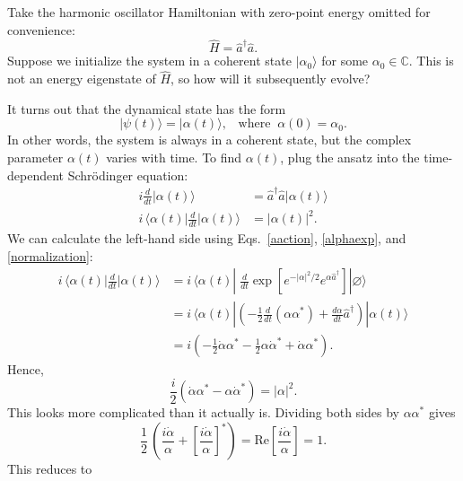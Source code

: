 \documentclass[pra,12pt]{revtex4}
\begin{document}
Take the harmonic oscillator Hamiltonian with zero-point energy
omitted for convenience:
\begin{equation}
  \hat{H} = \hat{a}^\dagger \hat{a}.
\end{equation}
Suppose we initialize the system in a coherent state
$|\alpha_0\rangle$ for some $\alpha_0 \in \mathbb{C}$.  This is not an
energy eigenstate of $\hat{H}$, so how will it subsequently evolve?

It turns out that the dynamical state has the form
\begin{equation}
  |\psi(t)\rangle = |\alpha(t)\rangle, \;\;\;\mathrm{where}\;\;\alpha(0) = \alpha_0.
\end{equation}
In other words, the system is always in a coherent state, but the
complex parameter $\alpha(t)$ varies with time.  To find $\alpha(t)$,
plug the ansatz into the time-dependent Schr\"odinger equation:
\begin{align}
  i \frac{d}{dt} |\alpha(t)\rangle &= \hat{a}^\dagger \hat{a} |\alpha(t)\rangle\\
  i \,\Big\langle\alpha(t)\Big| \frac{d}{dt} \Big|\alpha(t)\Big\rangle &=
  |\alpha(t)|^2.
\end{align}
We can calculate the left-hand side using Eqs.~\eqref{aaction},
\eqref{alphaexp}, and \eqref{normalization}:
\begin{align}
  i \, \Big\langle\alpha(t)\Big| \frac{d}{dt} \Big|\alpha(t)\Big\rangle
  &= i\, \langle \alpha(t) | \; \frac{d}{dt}
  \exp\left[ e^{-|\alpha|^2/2} e^{\alpha\hat{a}^\dagger} \right]
  |\varnothing\rangle \\
  &= i\, \langle \alpha(t) | \left(-\frac{1}{2} \frac{d}{dt}(\alpha\alpha^*)
  + \frac{d\alpha}{dt} \hat{a}^\dagger \right) |\alpha(t)\rangle \\
  &= i \left(-\frac{1}{2} \dot{\alpha}\alpha^*
  - \frac{1}{2}\alpha\dot{\alpha}^* + \dot{\alpha}\alpha^*\right).
\end{align}
Hence,
\begin{equation}
  \frac{i}{2}\left(\dot{\alpha}\alpha^* - \alpha\dot{\alpha}^*\right) = |\alpha|^2.
  \label{eom}
\end{equation}
This looks more complicated than it actually is.  Dividing both sides by
$\alpha \alpha^*$ gives
\begin{equation}
  \frac{1}{2}\, \left(\frac{i\dot{\alpha}}{\alpha} + \left[\frac{i\dot{\alpha}}{\alpha}\right]^*\right) = \mathrm{Re}\left[\frac{i\dot{\alpha}}{\alpha}\right] = 1.
\end{equation}
This reduces to
\end{document}
